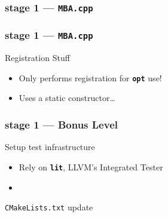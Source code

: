 \documentclass[14pt]{beamer}
\newcommand{\Command}[1]{\textbf{\texttt{#1}}}
\begin{document}
    \begin{frame}[containsverbatim]
        \frametitle{stage 1 --- \texttt{MBA.cpp}}
        {
            \footnotesize
            
        }
    \end{frame}


    \begin{frame}[containsverbatim]
        \frametitle{stage 1 --- \texttt{MBA.cpp}}
        \begin{alertblock}{Registration Stuff}
            \begin{itemize}
                \item Only performs registration for \Command{opt} use!
                \item Uses a static constructor\dots
            \end{itemize}
        \end{alertblock}
        {
            \footnotesize
            
        }
    \end{frame}

    \begin{frame}[containsverbatim]
        \frametitle{stage 1 --- Bonus Level}
        \begin{alertblock}{Setup test infrastructure}
            \begin{itemize}
                \item Rely on \Command{lit}, LLVM's Integrated Tester
                \item {\footnotesize
\begin{lstlisting}[language=bash]
% pip install --user lit
\end{lstlisting}
                    }
            \end{itemize}
        \end{alertblock}

        \begin{block}{\texttt{CMakeLists.txt} update}
{
\scriptsize

}
        \end{block}
    \end{frame}
\end{document}
